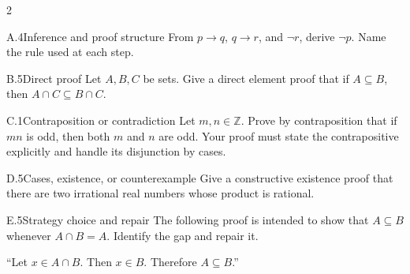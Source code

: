 \documentclass[9pt]{extarticle}
\begin{document}
\CoreWorkArea
\FormBreak
{}
\begin{multicols}{2}
\begin{CoreProblem}{A.4}{Inference and proof structure}
From $p\to q$, $q\to r$, and $\neg r$, derive $\neg p$. Name the rule used at
each step.
\end{CoreProblem}
\begin{CoreProblem}{B.5}{Direct proof}
Let $A,B,C$ be sets. Give a direct element proof that if $A\subseteq B$, then
$A\cap C\subseteq B\cap C$.
\end{CoreProblem}
\begin{CoreProblem}{C.1}{Contraposition or contradiction}
Let $m,n\in\mathbb Z$. Prove by contraposition that if $mn$ is odd, then both
$m$ and $n$ are odd. Your proof must state the contrapositive explicitly and
handle its disjunction by cases.
\end{CoreProblem}
\columnbreak
\begin{CoreProblem}{D.5}{Cases, existence, or counterexample}
Give a constructive existence proof that there are two irrational real numbers
whose product is rational.
\end{CoreProblem}
\begin{CoreProblem}{E.5}{Strategy choice and repair}
The following proof is intended to show that $A\subseteq B$ whenever
$A\cap B=A$. Identify the gap and repair it.

``Let $x\in A\cap B$. Then $x\in B$. Therefore $A\subseteq B$.''
\end{CoreProblem}
\end{multicols}
\CoreWorkArea
\FormBreak
{}
\end{document}
